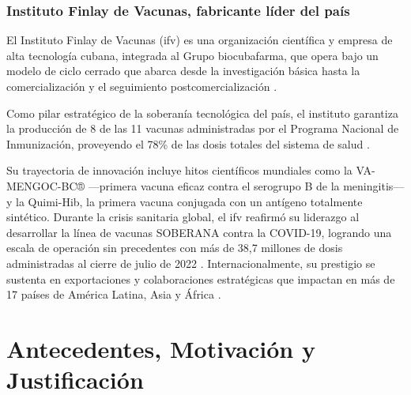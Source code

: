 \subsubsection*{Instituto Finlay de Vacunas, fabricante líder del país}

El Instituto Finlay de Vacunas (\gls{ifv}) es una organización científica y empresa de alta tecnología cubana, integrada al Grupo \gls{biocubafarma}, que opera bajo un modelo de ciclo cerrado que abarca desde la investigación básica hasta la comercialización y el seguimiento postcomercialización \cite{finlay_instituto_2026}.

Como pilar estratégico de la soberanía tecnológica del país, el instituto garantiza la producción de 8 de las 11 vacunas administradas por el Programa Nacional de Inmunización, proveyendo el 78\% de las dosis totales del sistema de salud \cite{carbonell_cmi_finlay_2016}.

Su trayectoria de innovación incluye hitos científicos mundiales como la VA-MENGOC-BC® —primera vacuna eficaz contra el serogrupo B de la meningitis— y la Quimi-Hib, la primera vacuna conjugada con un antígeno totalmente sintético. 
Durante la crisis sanitaria global, el \gls{ifv} reafirmó su liderazgo al desarrollar la línea de vacunas SOBERANA contra la COVID-19, logrando una escala de operación sin precedentes con más de 38,7 millones de dosis administradas al cierre de julio de 2022 \cite{finlay_instituto_2026}. 
Internacionalmente, su prestigio se sustenta en exportaciones y colaboraciones estratégicas que impactan en más de 17 países de América Latina, Asia y África \cite{carbonell_cmi_finlay_2016}.



\section{Antecedentes, Motivación y Justificación}\label{section:antecedentesMotivacionJustificacion}




